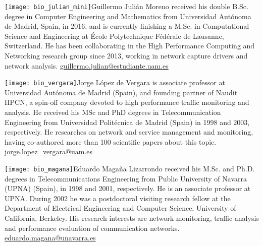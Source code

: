 \documentclass[AMA,STIX1COL]{WileyNJD-v2}
\begin{document}
\vspace{0.5cm}

\begin{biography}{\texttt{[image: bio\_julian\_mini]}}{{Guillermo Juli\'an Moreno} received his double B.Sc. degree in Computer Engineering and Mathematics from Universidad Aut\'onoma de Madrid, Spain, in 2016, and is currently finishing a M.Sc. in Computational Science and Engineering at \'Ecole Polytechnique F\'ed\'erale de Lausanne, Switzerland. He has been collaborating in the High Performance Computing and Networking research group since 2013, working in network capture drivers and network analysis.}
\hfill \href{mailto:guillermo.julian@estudiante.uam.es}{guillermo.julian@estudiante.uam.es}
\end{biography}

\vspace{0.5cm}

\begin{biography}{\texttt{[image: bio\_vergara]}}{{Jorge L\'opez de Vergara}
is associate professor at Universidad Aut\'onoma de Madrid (Spain), and founding partner of Naudit HPCN, a spin-off company devoted to high performance traffic monitoring and analysis. He received his MSc and PhD degrees in Telecommunication Engineering from Universidad Polit\'ecnica de Madrid (Spain) in 1998 and 2003, respectively. He researches on network and service management and monitoring, having co-authored more than 100 scientific papers about this topic.}
\hfill \href{mailto:jorge.lopez_vergara@uam.es}{jorge.lopez\_vergara@uam.es}
\end{biography}


\begin{biography}{\texttt{[image: bio\_magana]}}{{Eduardo Maga\~na Lizarrondo}
received his M.Sc. and Ph.D. degrees in Telecommunications Engineering from Public University of Navarra (UPNA) (Spain), in 1998 and 2001, respectively. He is an associate professor at UPNA. During 2002 he was a postdoctoral visiting research fellow at the Department of Electrical Engineering and Computer Science, University of California, Berkeley. His research interests are network monitoring, traffic analysis and performance evaluation of communication networks.}
\hfill \href{mailto:eduardo.magana@unavarra.es}{eduardo.magana@unavarra.es}
\end{biography}
\end{document}

